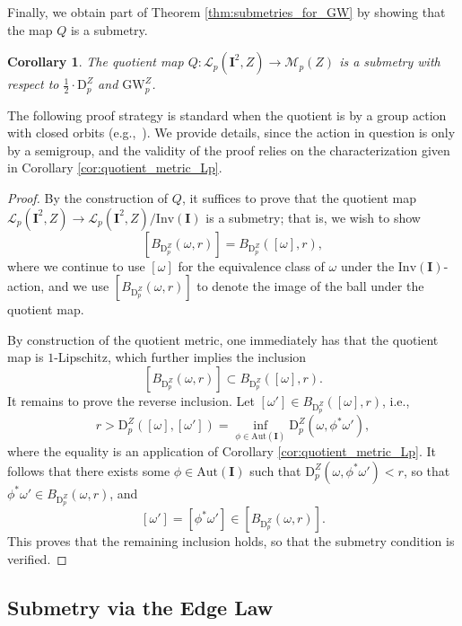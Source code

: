 \documentclass{article}
\newtheorem{corollary}[proposition]{Corollary}
\theoremstyle{definition}
\newcommand{\M}{\mathcal{M}}
\newcommand{\MZp}{\M_p(Z)}
\newcommand{\dgwz}{\mathrm{GW}_p^Z}
\newcommand{\Lp}{\mathcal{L}_p}
\newcommand{\dpz}{\mathrm{D}^Z_p}
\begin{document}
Finally, we obtain part of Theorem \ref{thm:submetries_for_GW} by showing that the map $Q$ is a submetry.

\begin{corollary}\label{cor:quotient_map_submetry}
    The quotient map $Q:\Lp(\mathbf{I}^2,Z) \to \MZp$ is a submetry with respect to $\tfrac{1}{2} \cdot \dpz$ and $\dgwz$.
\end{corollary}

The following proof strategy is standard when the quotient is by a group action with closed orbits (e.g.,~\cite[Proposition 3.8]{alexander2024alexandrov}). We provide details, since the action in question is only by a semigroup, and the validity of the proof relies on the characterization given in Corollary \ref{cor:quotient_metric_Lp}.

\begin{proof}
    By the construction of $Q$, it suffices to prove that the quotient map $\Lp(\mathbf{I}^2,Z) \to \Lp(\mathbf{I}^2,Z)/\mathrm{Inv}(\mathbf{I})$ is a submetry; that is, we wish  to show 
    \[
    \left[B_{\dpz}(\omega,r)\right] = B_{\dpz}([\omega],r),
    \]
    where we continue to use $[\omega]$ for the equivalence class of $\omega$ under the $\mathrm{Inv}(\mathbf{I})$-action, and we use $\left[B_{\dpz}(\omega,r)\right]$ to denote the image of the ball under the quotient map.
    
    By construction of the quotient metric, one immediately has that the quotient map is $1$-Lipschitz, which further implies the  inclusion
    \[
    \left[B_{\dpz}(\omega,r)\right] \subset B_{\dpz}([\omega],r).
    \]
    It remains to prove the reverse inclusion. Let $[\omega'] \in B_{\dpz}([\omega],r)$, i.e.,
    \[
    r > \dpz([\omega],[\omega']) = \inf_{\phi \in \mathrm{Aut}(\mathbf{I})} \dpz(\omega,\phi^\ast \omega'),
    \]
    where the equality is an application of Corollary \ref{cor:quotient_metric_Lp}. It follows that there exists some $\phi \in \mathrm{Aut}(\mathbf{I})$ such that $\dpz(\omega,\phi^\ast \omega') < r$, so that $\phi^\ast \omega' \in B_{\dpz}(\omega,r)$, and 
    \[
    [\omega'] = [\phi^\ast \omega'] \in \left[B_{\dpz}(\omega,r)\right].
    \]
    This proves that the remaining inclusion holds, so that the submetry condition is verified.
\end{proof}



\subsection{Submetry via the Edge Law}
\label{sec:relation_gw_wasserstein}
\end{document}
